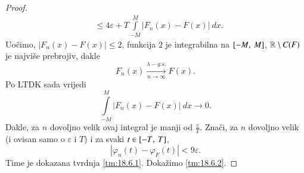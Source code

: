 \begin{proof}
\begin{equation*}
\begin{aligned}
            &\leq 4 \varepsilon + T \int\limits_{-M}^{M} |F_n (x) - F (x)| \: dx.
        \end{aligned}
    \end{equation*}
    Uo\v cimo, $|F_n (x) - F (x)| \leq 2$, funkcija $2$ je integrabilna na $[{-M}, \:{M}]$, $\mathbb{R} \setminus C(F)$ je najvi\v se prebrojiv, dakle
    \begin{equation*}
        F_n (x) \xrightarrow[n \to \infty]{\lambda-g.s.} F(x).
    \end{equation*}
    Po LTDK sada vrijedi
    \begin{equation*}
        \int\limits_{-M}^M |F_n (x) - F(x)| \: d x \to 0.
    \end{equation*}
    Dakle, za $n$ dovoljno velik ovaj integral je manji od $\frac{\varepsilon}{T}$.
    Zna\v ci, za $n$ dovoljno velik (i ovisan samo o $\varepsilon$ i $T$) i za svaki $t \in [{-T}, \:{T}]$,
    \begin{equation*}
        |\varphi_n (t) - \varphi_F (t)| < 9 \varepsilon.
    \end{equation*}
    Time je dokazana tvrdnja \ref{tm:18.6.1}.
    Doka\v zimo \ref{tm:18.6.2}.


\end{proof}
